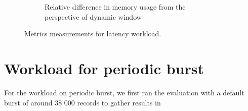 \begin{figure}
\begin{subfigure}[b]{\textwidth}
        \caption{Relative difference in memory usage from the perspective of dynamic window}
        \label{fig:constant_mem_diff}
    \end{subfigure}

    \caption{Metrics measurements for latency workload.}%
    \label{fig:constant_measurement}
\end{figure}

\section{Workload for periodic burst}%
\label{sec:Results Workload for periodic burst}

For the workload on periodic burst, we first ran the evaluation 
with a default burst of around 38 000 records to gather results in 


